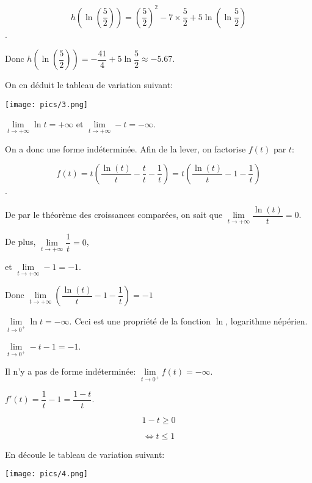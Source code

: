 \documentclass[a4paper,12pt]{scrartcl}
\begin{document}
$$h\left(\ln\left(\dfrac{5}{2}\right)\right) = \left( \dfrac{5}{2} \right)^2 - 7 \times \dfrac{5}{2} + 5 \ln\left( \ln \dfrac{5}{2} \right)$$.

Donc $h\left(\ln\left(\dfrac{5}{2}\right)\right) = -\dfrac{41}{4} + 5 \ln \dfrac{5}{2} \approx -5.67$.

On en déduit le tableau de variation suivant:

\begin{center}
\texttt{[image: pics/3.png]}
\end{center}

\exo{}



$\lim\limits_{t\to+\infty} \ln t = +\infty$ et $\lim\limits_{t\to+\infty} -t = -\infty$.

On a donc une forme indéterminée. Afin de la lever, on factorise $f(t)$ par $t$:

$$f(t) = t \left( \dfrac{\ln(t)}{t} - \dfrac{t}{t} - \dfrac{1}{t} \right) = t \left( \dfrac{\ln(t)}{t} - 1 - \dfrac{1}{t} \right)$$. 

De par le théorème des croissances comparées, on sait que $\lim\limits_{t\to+\infty} \dfrac{\ln(t)}{t} = 0$.

De plus, $\lim\limits_{t\to+\infty} \dfrac{1}{t} = 0$,

et $\lim\limits_{t\to+\infty} -1 = -1$.

Donc $\lim\limits_{t\to+\infty} \left( \dfrac{\ln(t)}{t} - 1 - \dfrac{1}{t} \right) = -1$


$\lim\limits_{t\to 0^+} \ln t = -\infty$. Ceci est une propriété de la fonction $\ln $, logarithme népérien.

$\lim\limits_{t\to 0^+} -t-1 = -1$. 

Il n'y a pas de forme indéterminée: $\lim\limits_{t\to 0^+} f(t) = -\infty$.


$f'(t) = \dfrac{1}{t} - 1 = \dfrac{1-t}{t}$.


$$1-t \geqslant 0$$

$$\Leftrightarrow t \leqslant 1$$

En découle le tableau de variation suivant:

\begin{center}
\texttt{[image: pics/4.png]}
\end{center}
\end{document}
